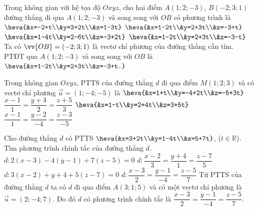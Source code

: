 \begin{ex}%
	Trong không gian với hệ tọa độ $O x y z$, cho hai điểm $A(1;2;-3)$, $B(-2;3;1)$ đường thẳng đi qua $A(1;2;-3)$ và song song với $OB$ có phương trình là 
	\choice 
	{$\heva{&x=-2+t\\&y=3+2t\\&z=1-3t}$}
	{\True $\heva{&x=1-2t\\&y=2+3t\\&z=-3+t}$}
	{$\heva{&x=1-4t\\&y=2-6t\\&z=-3+2t}$}
	{$\heva{&x=1-2t\\&y=2+3t\\&z=-3-t}$}
					\loigiai 
					{
	Ta có $\vv{OB}=(-2;3;1)$ là vectơ chỉ phương của đường thẳng cần tìm.\\
	PTĐT qua $A(1;2;-3)$ và song song với $OB$ là $\heva{&x=1-2t\\&y=2+3t\\&z=-3+t.}$
					}
\end{ex}

\begin{ex}%
Trong không gian $O x y z$, PTTS của đường thẳng $d$ đi qua điểm $M(1;2;3)$ và có vectơ chỉ phương $\vec{a}=(1;-4;-5)$ là 
\choice 
{$\heva{&x=1+t\\&y=-4+2t\\&z=-5+3t}$}
{$\dfrac{x-1}{1}=\dfrac{y+4}{2}=\dfrac{z+5}{3}$}
{$\heva{&x=1-t\\&y=2+4t\\&z=3+5t}$\True}
{$\dfrac{x-1}{1}=\dfrac{y-2}{-4}=\dfrac{z-3}{-5}$}
\end{ex}

\begin{ex}%
	Cho đường thẳng $d$ có PTTS $\heva{&x=3+2t\\&y=1-4t\\&z=5+7t}$, ($t\in\mathbb{R}$). Tìm phương trình chính tắc của đường thẳng $d$.
		\choice 
		{$d\colon2(x-3)-4(y-1)+7(z-5)=0$}
		{$d\colon\dfrac{x-2}{3}=\dfrac{y+4}{1}=\dfrac{z-7}{5}$}
		{$d\colon3(x-2)+y+4+5(z-7)=0$}
		{$d\colon\dfrac{x-3}{2}=\dfrac{y-1}{-4}=\dfrac{z-5}{7}$\True}
		\loigiai 
		{
Từ PTTS của đường thẳng $d$ ta có $d$ đi qua điểm $A(3;1;5)$ và có một vectơ chỉ phương là $\vec{u}=(2;-4;7)$. Do đó $d$ có phương trình chính tắc là $\dfrac{x-3}{2}=\dfrac{y-1}{-4}=\dfrac{z-5}{7}$.
		}
	\end{ex}

